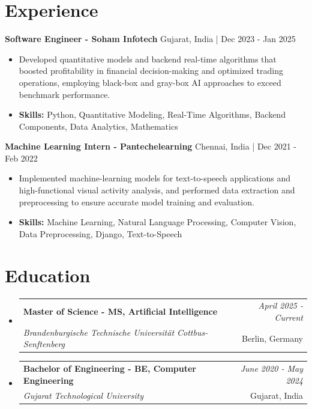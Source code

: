 \documentclass[a4paper,11pt]{article}
\makeatletter
\newcommand{\resumeSubheading}[4]{
\vspace{0.5mm}\item
    \begin{tabular*}{\linewidth}[t]{l@{\extracolsep{\fill}}r}
        \textbf{#1} & \textit{\footnotesize{#4}} \\
        \textit{\footnotesize{#3}} &  \footnotesize{#2}\\
    \end{tabular*}
    \vspace{-2.4mm}
}
\makeatother
\begin{document}
\section{\textbf{Experience}}


\vspace{1mm}
  \textbf{Software Engineer - Soham Infotech} \hfill Gujarat, India | Dec 2023 - Jan 2025
\vspace{-1.5mm} %
\begin{itemize}
  \item Developed quantitative models and backend real-time algorithms that boosted profitability in financial decision-making and optimized trading operations, employing black-box and gray-box AI approaches to exceed benchmark performance.

\vspace{-2mm}
  \item \textbf{Skills:} Python, Quantitative Modeling, Real-Time Algorithms, Backend Components, Data Analytics, Mathematics
\end{itemize}

\vspace{1mm}
  \textbf{Machine Learning Intern - Pantechelearning} \hfill Chennai, India | Dec 2021 - Feb 2022
\vspace{-1.5mm} %
\begin{itemize}
  \item Implemented machine-learning models for text-to-speech applications and high-functional visual activity analysis, and performed data extraction and preprocessing to ensure accurate model training and evaluation.
\vspace{-2mm}
  \item \textbf{Skills:} Machine Learning, Natural Language Processing, Computer Vision, Data Preprocessing, Django, Text-to-Speech
\end{itemize}\section{\textbf{Education}}
\vspace{-0.4mm}

\begin{itemize}[leftmargin=0.15in, label={}]
\resumeSubheading
{Master of Science - MS, Artificial Intelligence }{Berlin, Germany}
{Brandenburgische Technische Universität Cottbus-Senftenberg  }{April 2025 - Current}

\vspace{1.0mm} %
\resumeSubheading
{Bachelor of Engineering - BE, Computer Engineering  }{Gujarat, India}
{Gujarat Technological University }{June 2020 - May 2024}

\end{itemize}
\end{document}
